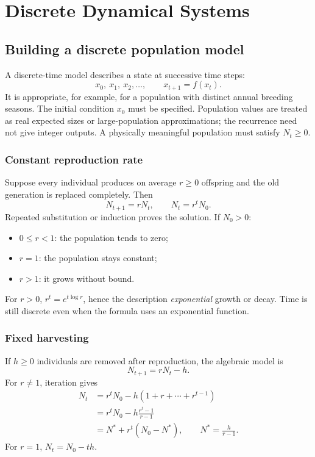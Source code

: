 \chapter{Discrete Dynamical Systems}\label{chap:applied-discrete}

\section{Building a discrete population model}
A discrete-time model describes a state at successive time steps:
\[
x_0,\ x_1,\ x_2,\ldots,\qquad x_{t+1}=f(x_t).
\]
It is appropriate, for example, for a population with distinct annual
breeding seasons. The initial condition $x_0$ must be specified.
Population values are treated as real expected sizes or large-population
approximations; the recurrence need not give integer outputs.
A physically meaningful population must satisfy $N_t\geq0$.

\subsection{Constant reproduction rate}
Suppose every individual produces on average $r\geq0$ offspring and the
old generation is replaced completely. Then
\[
N_{t+1}=rN_t,\qquad N_t=r^tN_0.
\]
Repeated substitution or induction proves the solution. If $N_0>0$:
\begin{itemize}
\item $0\leq r<1$: the population tends to zero;
\item $r=1$: the population stays constant;
\item $r>1$: it grows without bound.
\end{itemize}
For $r>0$, $r^t=e^{t\log r}$, hence the description \emph{exponential}
growth or decay. Time is still discrete even when the formula uses an
exponential function.

\subsection{Fixed harvesting}
If $h\geq0$ individuals are removed after reproduction, the algebraic model is
\[
N_{t+1}=rN_t-h.
\]
For $r\ne1$, iteration gives
\begin{align*}
N_t&=r^tN_0-h(1+r+\cdots+r^{t-1})\\
&=r^tN_0-h\frac{r^t-1}{r-1}\\
&=N^*+r^t(N_0-N^*),\qquad N^*=\frac h{r-1}.
\end{align*}
For $r=1$, $N_t=N_0-th$.

